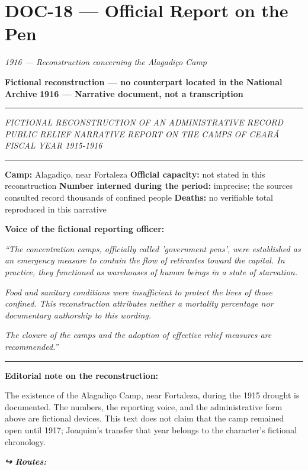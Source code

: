 \section*{\textbf{DOC-18} --- Official Report on the Pen}

\noindent \textit{1916 --- Reconstruction concerning the Alagadiço Camp}

\noindent \textbf{Fictional reconstruction --- no counterpart located in the National Archive}
\textbf{1916 --- Narrative document, not a transcription}

\vspace{0.5em}\noindent\rule{\textwidth}{0.5pt}\vspace{0.5em}

\noindent \textit{FICTIONAL RECONSTRUCTION OF AN ADMINISTRATIVE RECORD}
\textit{PUBLIC RELIEF}
\textit{NARRATIVE REPORT ON THE CAMPS OF CEARÁ}
\textit{FISCAL YEAR 1915-1916}

\vspace{0.5em}\noindent\rule{\textwidth}{0.5pt}\vspace{0.5em}

\noindent \textbf{Camp:} Alagadiço, near Fortaleza
\textbf{Official capacity:} not stated in this reconstruction
\textbf{Number interned during the period:} imprecise; the sources consulted record thousands of confined people
\textbf{Deaths:} no verifiable total reproduced in this narrative

\noindent \textbf{Voice of the fictional reporting officer:}

\noindent \textit{\textquotedblleft{}The concentration camps, officially called 'government pens', were established as an emergency measure to contain the flow of retirantes toward the capital. In practice, they functioned as warehouses of human beings in a state of starvation.}

\noindent \textit{Food and sanitary conditions were insufficient to protect the lives of those confined. This reconstruction attributes neither a mortality percentage nor documentary authorship to this wording.}

\noindent \textit{The closure of the camps and the adoption of effective relief measures are recommended.\textquotedblright{}}

\vspace{0.5em}\noindent\rule{\textwidth}{0.5pt}\vspace{0.5em}

\noindent \textbf{Editorial note on the reconstruction:}

\noindent The existence of the Alagadiço Camp, near Fortaleza, during the 1915 drought is documented. The numbers, the reporting voice, and the administrative form above are fictional devices. This text does not claim that the camp remained open until 1917; Joaquim's transfer that year belongs to the character's fictional chronology.

\vspace{0.5em}
\noindent\textit{\textbf{↪ Routes:}  \rotasep {}}
